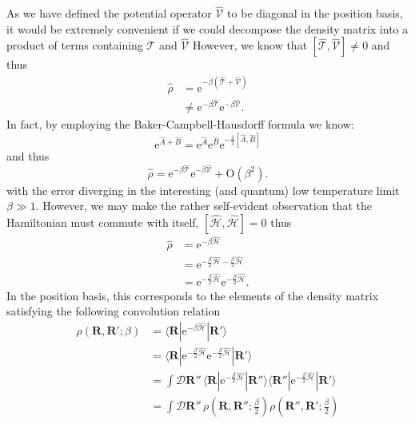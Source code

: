 \documentclass[prb,aps,amssym,nofootinbib,floatfix,notitlepage]{revtex4-1}
\renewcommand{\vec}[1]{\boldsymbol{#1}}
\newcommand{\e}[1]{\mathrm{e}^{#1}}
\newcommand{\R}{\vec{R}}
\begin{document}
As we have defined the potential operator $\hat{\mathcal{V}}$ to be diagonal in
the position basis, it would be extremely convenient if we could decompose the
density matrix into a product of terms containing $\hat{\mathcal{T}}$ and
$\hat{\mathcal{V}}$ However, we know that
$[\hat{\mathcal{T}},\hat{\mathcal{V}}] \ne 0$ and thus
%
\begin{align}
    \hat{\rho} &= \e{-\beta(\hat{\mathcal{T}} + \hat{\mathcal{V}})} \nonumber
    \\
&\ne \e{-\beta\hat{\mathcal{T}}}\e{-\beta\hat{\mathcal{V}}}.
\end{align}
%
In fact, by employing the Baker-Campbell-Hausdorff formula we know:
%
\begin{equation}
    \e{\hat{A}+\hat{B}} = \e{\hat{A}}\e{\hat{B}}\e{-\frac{1}{2}[\hat{A},\hat{B}]}
    \label{eq:BCH}
\end{equation}
%
and thus 
%
\begin{equation}
    \hat{\rho} = \e{-\beta\hat{\mathcal{T}}}\e{-\beta\hat{\mathcal{V}}} +
    \mathrm{O}\left(\beta^2\right).
\end{equation}
%
with the error diverging in the interesting (and quantum) low temperature limit
$\beta \gg 1$.  However, we may make the rather self-evident observation that
the Hamiltonian must commute with itself,
$[\hat{\mathcal{H}},\hat{\mathcal{H}}] = 0$ thus
%
\begin{align}
    \hat{\rho} &= \e{-\beta \hat{\mathcal{H}}} \nonumber \\
               &= \e{-\frac{\beta}{2}\hat{\mathcal{H}}
-\frac{\beta}{2}\hat{\mathcal{H}}} \nonumber \\
&= \e{-\frac{\beta}{2}\hat{\mathcal{H}}}\e{-\frac{\beta}{2}\hat{\mathcal{H}}}.
\label{eq:HamCommute}
\end{align}
%
In the position basis, this corresponds to the elements of the density matrix
satisfying the following convolution relation
%
\begin{align}
    \rho(\R,\R';\beta) &=  \langle \R | \e{-\beta \hat{\mathcal{H}}} | \R'\rangle \nonumber \\
    &=  \langle \R | \e{-\frac{\beta}{2} \hat{\mathcal{H}}} 
    \e{-\frac{\beta}{2} \hat{\mathcal{H}}}| \R'\rangle \nonumber \\
    &= \int \mathcal{D}\R''\,
    \langle \R | \e{-\frac{\beta}{2} \hat{\mathcal{H}}} | \R''\rangle 
    \langle \R'' | \e{-\frac{\beta}{2} \hat{\mathcal{H}}} | \R'\rangle \nonumber \\
    &= \int \mathcal{D}\R''\,
    \rho\left(\R,\R'';\frac{\beta}{2}\right)
    \rho\left(\R'',\R';\frac{\beta}{2}\right)
\label{eq:rhoConvolution}
\end{align}
\end{document}
